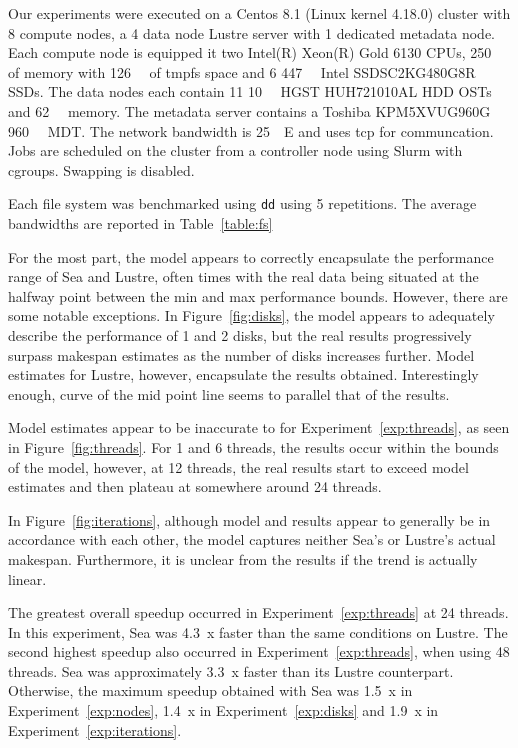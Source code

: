\documentclass{report}
\begin{document}
    Our experiments were executed on a Centos 8.1 (Linux kernel 4.18.0) cluster with 8 compute nodes,
    a 4 data node Lustre server with 1 dedicated metadata node. Each compute node
    is equipped it two Intel(R) Xeon(R) Gold 6130 CPUs, \SI{250}{\gibi\byte} of memory with
    \SI{126}{\gibi\byte} of tmpfs space and 6 \SI{447}{\gibi\byte} Intel SSDSC2KG480G8R SSDs.
    The data nodes each contain 11 \SI{10}{\tera\byte} HGST HUH721010AL HDD OSTs
    and \SI{62}{\gibi\byte} memory. The metadata server contains a Toshiba KPM5XVUG960G \SI{960}{\giga\byte} MDT.
    The network bandwidth is \SI{25}{\giga\bit}E and uses tcp for communcation.
    Jobs are scheduled on the cluster from a controller node using Slurm with cgroups. Swapping is
    disabled.

    Each file system was benchmarked using \texttt{dd} using 5 repetitions. The average bandwidths are
    reported in Table~\ref{table:fs}

    For the most part, the model appears to correctly encapsulate the
    performance range of Sea and Lustre, often times with the real data being
    situated at the halfway point between the min and max performance bounds.
    However, there are some notable exceptions.
    In Figure~\ref{fig:disks}, the model appears to adequately describe the
    performance of 1 and 2 disks, but the real results progressively surpass
    makespan estimates as the number of disks increases further. Model estimates
    for Lustre, however, encapsulate the results obtained. Interestingly
    enough, curve of the mid point line seems to parallel that of the results.

    Model estimates appear to be inaccurate to for Experiment~\ref{exp:threads}, as seen in
    Figure~\ref{fig:threads}. For 1 and 6 threads, the results occur within
    the bounds of the model, however, at 12 threads, the real results start
    to exceed model estimates and then plateau at somewhere around 24 threads.

    In Figure~\ref{fig:iterations}, although model and results appear to
    generally be in accordance with each other, the model captures neither
    Sea's or Lustre's actual makespan. Furthermore, it is unclear from the
    results if the trend is actually linear.

    The greatest overall speedup occurred in Experiment~\ref{exp:threads} at 24 threads. In 
    this experiment, Sea was 4.3~x faster than the same conditions on Lustre.
    The second highest speedup also occurred in Experiment~\ref{exp:threads}, when using 48
    threads. Sea was approximately 3.3~x faster than its Lustre counterpart.
    Otherwise, the maximum speedup obtained with Sea was 1.5~x in Experiment~\ref{exp:nodes},
    1.4~x in Experiment~\ref{exp:disks} and 1.9~x in Experiment~\ref{exp:iterations}.
\end{document}
